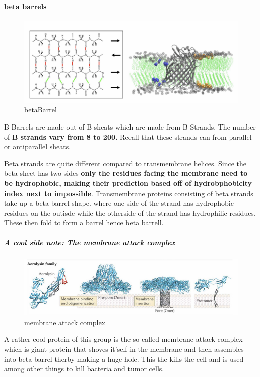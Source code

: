\documentclass[../main.tex]{subfiles}
\begin{document}
\paragraph{beta barrels}

\begin{figure}[H]
    \centering
    \includegraphics[width=0.5\linewidth]{BBarrel.png}
    \caption{\gls{betaBarrel}}
    \label{fig:enter-label}
\end{figure}

B-Barrels are made out of B sheats which are made from B Strands. The number of \textbf{B strands vary from 8 to 200.}  Recall that these strands can from parallel or antiparallel sheats.
\par
Beta strands are quite different compared to transmembrane helices. Since the beta sheet has two sides \textbf{only the residues facing the membrane need to be hydrophobic, making their prediction based off of hydrobphobicity index next to impossible}. Transmembrane proteins consisting of beta strands take up a beta barrel shape. where one side of the strand has hydrophobic residues on the outisde while the otherside of the strand has hydrophilic residues. These then fold to form a barrel hence beta barrell.

\subparagraph{A cool side note: The membrane attack complex}

\begin{figure}[H]
    \centering
    \includegraphics[width=0.5\linewidth]{MAC.png}
    \caption{membrane attack complex}
    \label{fig:enter-label}
\end{figure}

A rather cool protein of this group is the so called membrane attack complex which is giant protein that shoves it'self in the membrane and then assembles into beta barrel therby making a huge hole. This the kills the cell and is used among other things to kill bacteria and tumor cells.
\end{document}
